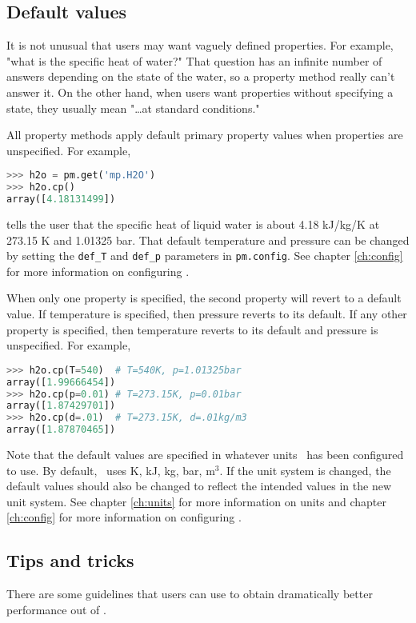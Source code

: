 \subsection{Default values}

It is not unusual that users may want vaguely defined properties.  For example, "what is the specific heat of water?"  That question has an infinite number of answers depending on the state of the water, so a property method really can't answer it.  On the other hand, when users want properties without specifying a state, they usually mean "\ldots at standard conditions."

All property methods apply default primary property values when properties are unspecified.  For example,
\begin{lstlisting}[language=Python]
>>> h2o = pm.get('mp.H2O')
>>> h2o.cp()
array([4.18131499])
\end{lstlisting}
tells the user that the specific heat of liquid water is about 4.18 kJ/kg/K at 273.15 K and 1.01325 bar.  That default temperature and pressure can be changed by setting the \verb|def_T| and \verb|def_p| parameters in \texttt{pm.config}.  See chapter \ref{ch:config} for more information on configuring \PM.

When only one property is specified, the second property will revert to a default value.  If temperature is specified, then pressure reverts to its default.  If any other property is specified, then temperature reverts to its default and pressure is unspecified.  For example,
\begin{lstlisting}[language=Python]
>>> h2o.cp(T=540)  # T=540K, p=1.01325bar
array([1.99666454])
>>> h2o.cp(p=0.01) # T=273.15K, p=0.01bar
array([1.87429701])
>>> h2o.cp(d=.01)  # T=273.15K, d=.01kg/m3
array([1.87870465])
\end{lstlisting}

Note that the default values are specified in whatever units \PM\ has been configured to use.  By default, \PM\ uses K, kJ, kg, bar, m$^3$.  If the unit system is changed, the default values should also be changed to reflect the intended values in the new unit system.  See chapter \ref{ch:units} for more information on units and chapter \ref{ch:config} for more information on configuring \PM.

\subsection{Tips and tricks}

There are some guidelines that users can use to obtain dramatically better performance out of \PM.


